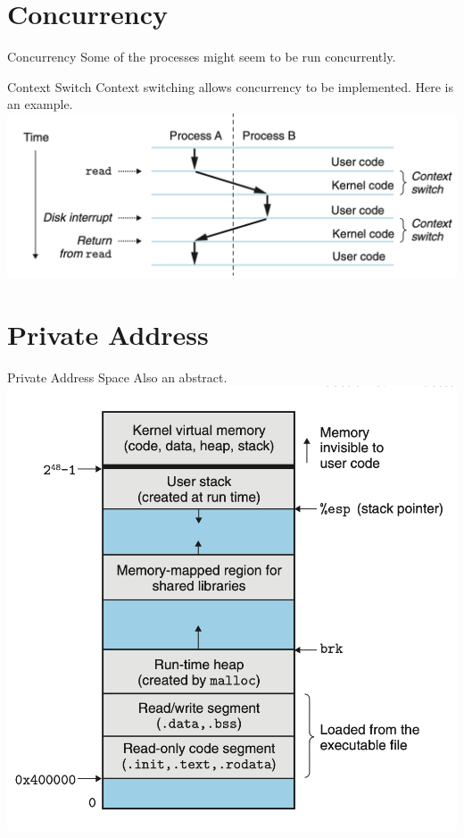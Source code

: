 \documentclass{beamer}
\begin{document}
    \section{Concurrency}
    \begin{frame}{Concurrency}
        Some of the processes might seem to be run concurrently.
    \end{frame}
    \begin{frame}{Context Switch}
       Context switching allows concurrency to be implemented. Here is an example.
       \includegraphics[width=\textwidth]{contextswitching.png}
    \end{frame}

    \section{Private Address}
    \begin{frame}{Private Address Space}
        Also an abstract.
        \includegraphics[width=\textwidth]{privatememory.png}
    \end{frame}
\end{document}
